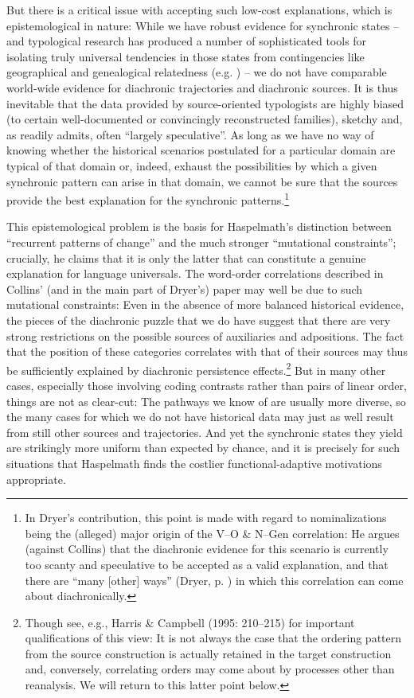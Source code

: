 \documentclass[output=paper]{langsci/langscibook}
\begin{document}
But there is a critical issue with accepting such low-cost explanations, which is epistemological in nature: While we have robust evidence for synchronic states – and typological research has produced a number of sophisticated tools for isolating truly universal tendencies in those states from contingencies like geographical and genealogical relatedness (e.g. \citealt{Bickel2013,Bickel2018,JaegerEtAl2011}) – we do not have comparable world-wide evidence for diachronic trajectories and diachronic sources. It is thus inevitable that the data provided by source-oriented typologists are highly biased (to certain well-documented or convincingly reconstructed families), sketchy and, as \citet[3]{Creissels2008} readily admits, often “largely speculative”. As long as we have no way of knowing whether the historical scenarios postulated for a particular domain are typical of that domain or, indeed, exhaust the possibilities by which a given synchronic pattern can arise in that domain, we cannot be sure that the sources provide the best explanation for the synchronic patterns.\footnote{In Dryer’s contribution, this point is made with regard to nominalizations being the (alleged) major origin of the V–O \& N–Gen correlation: He argues (against Collins) that the diachronic evidence for this scenario is currently too scanty and speculative to be accepted as a valid explanation, and that there are “many [other] ways” (Dryer, p. \pageref{p:dryer:manyotherways}) in which this correlation can come about diachronically.} 

This epistemological problem is the basis for Haspelmath’s distinction between “recurrent patterns of change” and the much stronger “mutational constraints”; crucially, he claims that it is only the latter that can constitute a genuine explanation for language universals. The word-order correlations described in Collins’ (and in the main part of Dryer’s) paper may well be due to such mutational constraints: Even in the absence of more balanced historical evidence, the pieces of the diachronic puzzle that we do have suggest that there are very strong restrictions on the possible sources of auxiliaries and adpositions. The fact that the position of these categories correlates with that of their sources may thus be sufficiently explained by diachronic persistence effects.\footnote{Though see, e.g., Harris \& Campbell (1995: 210–215) for important qualifications of this view: It is not always the case that the ordering pattern from the source construction is actually retained in the target construction and, conversely, correlating orders may come about by processes other than reanalysis. We will return to this latter point below.} But in many other cases, especially those involving coding contrasts rather than pairs of linear order, things are not as clear-cut: The pathways we know of are usually more diverse, so the many cases for which we do not have historical data may just as well result from still other sources and trajectories. And yet the synchronic states they yield are strikingly more uniform than expected by chance, and it is precisely for such situations that Haspelmath finds the costlier functional-adaptive motivations appropriate.
\end{document}
